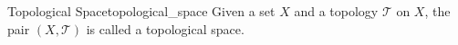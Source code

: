 \begin{definition}
{Topological Space}{topological_space}
Given a set \(X\) and a topology \(\mathcal{T}\) on \(X\), the pair \((X,
\mathcal{T})\) is called a topological space. 
\end{definition}
